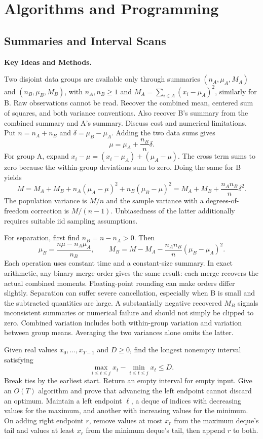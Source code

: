 \chapter{Algorithms and Programming}
\section{Summaries and Interval Scans}
\noindent\textbf{Key Ideas and Methods.}\enspace


Two disjoint data groups are available only through summaries $(n_A,\mu_A,M_A)$ and $(n_B,\mu_B,M_B)$, with $n_A,n_B\ge1$ and $M_A=\sum_{i\in A}(x_i-\mu_A)^2$, similarly for B. Raw observations cannot be read. Recover the combined mean, centered sum of squares, and both variance conventions. Also recover B's summary from the combined summary and A's summary. Discuss cost and numerical limitations.
\solution Put $n=n_A+n_B$ and $\delta=\mu_B-\mu_A$. Adding the two data sums gives
\[
\mu=\mu_A+\frac{n_B}{n}\delta.
\]
For group A, expand $x_i-\mu=(x_i-\mu_A)+(\mu_A-\mu)$. The cross term sums to zero because the within-group deviations sum to zero. Doing the same for B yields
\[
M=M_A+M_B+n_A(\mu_A-\mu)^2+n_B(\mu_B-\mu)^2
 =M_A+M_B+\frac{n_An_B}{n}\delta^2.
\]
The population variance is $M/n$ and the sample variance with a degrees-of-freedom correction is $M/(n-1)$. Unbiasedness of the latter additionally requires suitable iid sampling assumptions.

For separation, first find $n_B=n-n_A>0$. Then
\[
\mu_B=\frac{n\mu-n_A\mu_A}{n_B},\qquad
M_B=M-M_A-\frac{n_An_B}{n}(\mu_B-\mu_A)^2.
\]
Each operation uses constant time and a constant-size summary. In exact arithmetic, any binary merge order gives the same result: each merge recovers the actual combined moments. Floating-point rounding can make orders differ slightly. Separation can suffer severe cancellation, especially when B is small and the subtracted quantities are large. A substantially negative recovered $M_B$ signals inconsistent summaries or numerical failure and should not simply be clipped to zero.
\insight Combined variation includes both within-group variation and variation between group means. Averaging the two variances alone omits the latter.

Given real values $x_0,\ldots,x_{T-1}$ and $D\ge0$, find the longest nonempty interval satisfying
\[
\max_{i\le t\le j}x_t-\min_{i\le t\le j}x_t\le D.
\]
Break ties by the earliest start. Return an empty interval for empty input. Give an $O(T)$ algorithm and prove that advancing the left endpoint cannot discard an optimum.
\solution Maintain a left endpoint $\ell$, a deque of indices with decreasing values for the maximum, and another with increasing values for the minimum. On adding right endpoint $r$, remove values at most $x_r$ from the maximum deque's tail and values at least $x_r$ from the minimum deque's tail, then append $r$ to both.

